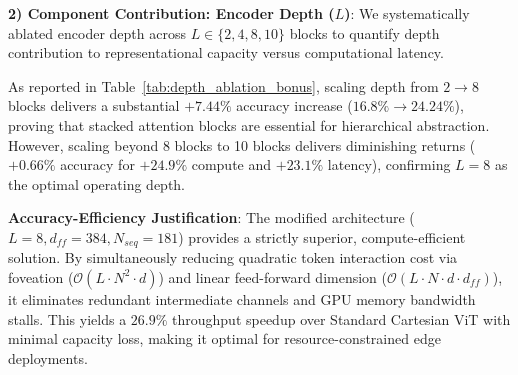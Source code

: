 \documentclass[10pt,conference]{IEEEtran}
\begin{document}
\textbf{2) Component Contribution: Encoder Depth ($L$)}:
We systematically ablated encoder depth across $L \in \{2, 4, 8, 10\}$ blocks to quantify depth contribution to representational capacity versus computational latency.

\begin{table}[h]
\centering
\caption{Component Contribution: Encoder Depth ($L$) Ablation (FOVI-ViT)}
\label{tab:depth_ablation_bonus}
\end{table}

As reported in Table~\ref{tab:depth_ablation_bonus}, scaling depth from $2 \to 8$ blocks delivers a substantial $\mathbf{+7.44\%}$ accuracy increase ($16.8\% \to 24.24\%$), proving that stacked attention blocks are essential for hierarchical abstraction. However, scaling beyond 8 blocks to 10 blocks delivers diminishing returns ($+0.66\%$ accuracy for $+24.9\%$ compute and $+23.1\%$ latency), confirming $L=8$ as the optimal operating depth.

\textbf{Accuracy-Efficiency Justification}:
The modified architecture ($L=8, d_{ff}=384, N_{seq}=181$) provides a strictly superior, compute-efficient solution. By simultaneously reducing quadratic token interaction cost via foveation ($\mathcal{O}(L \cdot N^2 \cdot d)$) and linear feed-forward dimension ($\mathcal{O}(L \cdot N \cdot d \cdot d_{ff})$), it eliminates redundant intermediate channels and GPU memory bandwidth stalls. This yields a $\mathbf{26.9\%}$ throughput speedup over Standard Cartesian ViT with minimal capacity loss, making it optimal for resource-constrained edge deployments.
\end{document}
